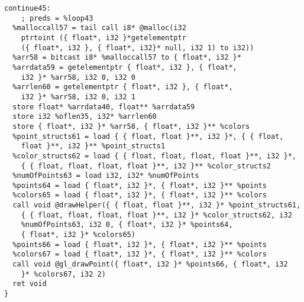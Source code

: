 \documentclass[main.tex]{subfiles}
\begin{document}
{\begin{lstlisting}
continue45:                                       
    ; preds = %loop43
  %malloccall57 = tail call i8* @malloc(i32
    ptrtoint ({ float*, i32 }*getelementptr
    ({ float*, i32 }, { float*, i32}* null, i32 1) to i32))
  %arr58 = bitcast i8* %malloccall57 to { float*, i32 }*
  %arrdata59 = getelementptr { float*, i32 }, { float*,
    i32 }* %arr58, i32 0, i32 0
  %arrlen60 = getelementptr { float*, i32 }, { float*,
    i32 }* %arr58, i32 0, i32 1
  store float* %arrdata40, float** %arrdata59
  store i32 %oflen35, i32* %arrlen60
  store { float*, i32 }* %arr58, { float*, i32 }** %colors
  %point_structs61 = load { { float, float }**, i32 }*, { { float, 
    float }**, i32 }** %point_structs1
  %color_structs62 = load { { float, float, float, float }**, i32 }*, 
    { { float, float, float, float }**, i32 }** %color_structs2
  %numOfPoints63 = load i32, i32* %numOfPoints
  %points64 = load { float*, i32 }*, { float*, i32 }** %points
  %colors65 = load { float*, i32 }*, { float*, i32 }** %colors
  call void @drawHelper({ { float, float }**, i32 }* %point_structs61, 
    { { float, float, float, float }**, i32 }* %color_structs62, i32 
    %numOfPoints63, i32 0, { float*, i32 }* %points64,
    { float*, i32 }* %colors65)
  %points66 = load { float*, i32 }*, { float*, i32 }** %points
  %colors67 = load { float*, i32 }*, { float*, i32 }** %colors
  call void @gl_drawPoint({ float*, i32 }* %points66, { float*, i32 
    }* %colors67, i32 2)
  ret void
}


\end{lstlisting}}
\end{document}
